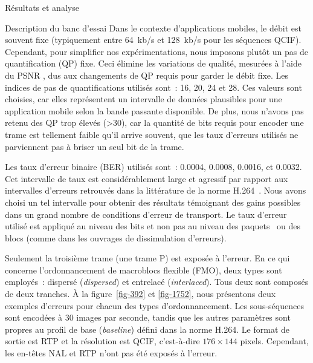 \documentclass[letterpaper, twoside, 12pt,memoire]{thETS}
\newcommand{\LT}[1]{%
	{
	\todo[inline,color={red!33!green!33!blue!33}]{%
	\textbf{[LT]:}~#1}
	}}
\newcommand{\fig}[1]{figure~\ref{#1}}
\newcommand{\ang}[1]{(\textit{#1})}
\begin{document}
\begin{chapter}{Résultats et analyse}
\begin{section}{Description du banc d'essai}
Dans le contexte d'applications mobiles, le débit est souvent fixe (typiquement
entre 64~kb/s et 128~kb/s pour les séquences QCIF). Cependant, pour simplifier
nos expérimentations, nous imposons plutôt un pas de quantification (QP) fixe.
Ceci élimine les variations de qualité, mesurées à l'aide du PSNR\LT{Définir
PSNR}, dus aux changements de QP requis pour garder le débit fixe. Les indices
de pas de quantifications utilisés sont~: 16, 20, 24 et 28. Ces valeurs sont
choisies, car elles représentent un intervalle de données plausibles pour une
application mobile selon la bande passante disponible. De plus, nous n'avons pas
retenu des QP trop élevés (>30), car la quantité de bits requis pour encoder une
trame est tellement faible qu’il arrive souvent, que les taux d’erreurs utilisés
ne parviennent pas à briser un seul bit de la trame.

Les taux d'erreur binaire (BER) utilisés sont~: 0.0004, 0.0008, 0.0016, et
0.0032. Cet intervalle de taux est considérablement large et agressif par
rapport aux intervalles d'erreurs retrouvés dans la littérature de la norme
H.264~\citep{Stockhammer2003}. Nous avons choisi un tel intervalle pour obtenir
des résultats témoignant des gains possibles dans un grand nombre de conditions
d'erreur de transport. Le taux d'erreur utilisé est appliqué au niveau des bits
et non pas au niveau des paquets~\citep{Wenger2003} ou des blocs (comme dans les
ouvrages de dissimulation d'erreurs).

Seulement la troisième trame (une trame P) est exposée à l'erreur. En ce qui
concerne l'ordonnancement de macroblocs flexible (FMO), deux types sont
employés~: dispersé \ang{dispersed} et entrelacé \ang{interlaced}. Tous deux
sont composés de deux tranches. À la \fig{fig-392} et \ref{fig-1752}, nous
présentons deux exemples d'erreurs pour chacun des types d'ordonnancement. Les
sous-séquences sont encodées à 30 images par seconde, tandis que les autres
paramètres sont propres au profil de base \ang{baseline} défini dans la norme
H.264. Le format de sortie est RTP et la résolution est QCIF, c'est-à-dire
$176\times 144$ pixels. Cependant, les en-têtes NAL et RTP n'ont pas été exposés
à l'erreur.


\end{section}
\end{chapter}
\end{document}
